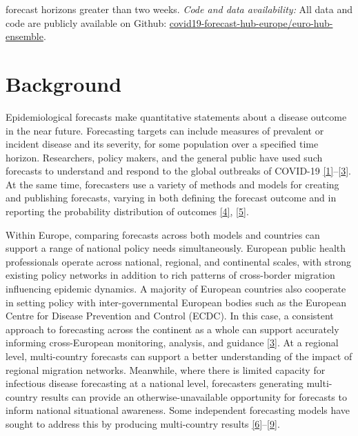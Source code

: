 \documentclass[
]{article}
\begin{document}
forecast horizons greater than two weeks. \emph{Code and data availability:} All data and code are publicly available on Github: \href{https://github.com/covid19-forecast-hub-europe/euro-hub-ensemble}{covid19-forecast-hub-europe/euro-hub-ensemble}.

\hypertarget{background}{%
\section{Background}\label{background}}

Epidemiological forecasts make quantitative statements about a disease outcome in the near future. Forecasting targets can include measures of prevalent or incident disease and its severity, for some population over a specified time horizon. Researchers, policy makers, and the general public have used such forecasts to understand and respond to the global outbreaks of COVID-19 \protect\hyperlink{ref-basshuysenThreeWaysWhich2021}{{[}1{]}}--\protect\hyperlink{ref-europeancentrefordiseasepreventionandcontrolForecastingCOVID19Cases2021}{{[}3{]}}. At the same time, forecasters use a variety of methods and models for creating and publishing forecasts, varying in both defining the forecast outcome and in reporting the probability distribution of outcomes \protect\hyperlink{ref-zelnerAccountingUncertaintyPandemic2021}{{[}4{]}}, \protect\hyperlink{ref-jamesUseMisuseMathematical2021}{{[}5{]}}.

Within Europe, comparing forecasts across both models and countries can support a range of national policy needs simultaneously. European public health professionals operate across national, regional, and continental scales, with strong existing policy networks in addition to rich patterns of cross-border migration influencing epidemic dynamics. A majority of European countries also cooperate in setting policy with inter-governmental European bodies such as the European Centre for Disease Prevention and Control (ECDC). In this case, a consistent approach to forecasting across the continent as a whole can support accurately informing cross-European monitoring, analysis, and guidance \protect\hyperlink{ref-europeancentrefordiseasepreventionandcontrolForecastingCOVID19Cases2021}{{[}3{]}}. At a regional level, multi-country forecasts can support a better understanding of the impact of regional migration networks. Meanwhile, where there is limited capacity for infectious disease forecasting at a national level, forecasters generating multi-country results can provide an otherwise-unavailable opportunity for forecasts to inform national situational awareness. Some independent forecasting models have sought to address this by producing multi-country results \protect\hyperlink{ref-aguasModellingCOVID19Pandemic2020}{{[}6{]}}--\protect\hyperlink{ref-agostoMonitoringCOVID19Contagion2021}{{[}9{]}}.
\end{document}
